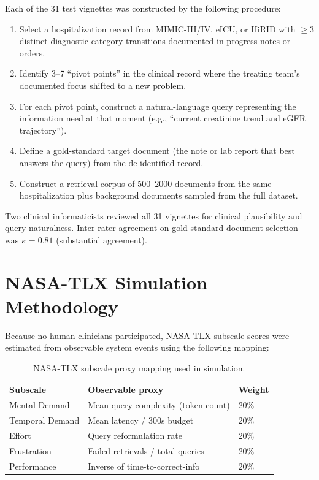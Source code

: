\documentclass[11pt]{article}
\begin{document}
Each of the 31 test vignettes was constructed by the following procedure:
\begin{enumerate}
  \item Select a hospitalization record from MIMIC-III/IV, eICU, or HiRID with
        $\geq 3$ distinct diagnostic category transitions documented in progress
        notes or orders.
  \item Identify 3--7 ``pivot points'' in the clinical record where the
        treating team's documented focus shifted to a new problem.
  \item For each pivot point, construct a natural-language query representing
        the information need at that moment (e.g., ``current creatinine trend
        and eGFR trajectory'').
  \item Define a gold-standard target document (the note or lab report that
        best answers the query) from the de-identified record.
  \item Construct a retrieval corpus of 500--2000 documents from the same
        hospitalization plus background documents sampled from the full dataset.
\end{enumerate}

Two clinical informaticists reviewed all 31 vignettes for clinical plausibility
and query naturalness. Inter-rater agreement on gold-standard document selection
was $\kappa = 0.81$ (substantial agreement).

\section{NASA-TLX Simulation Methodology}

Because no human clinicians participated, NASA-TLX subscale scores were estimated
from observable system events using the following mapping:

\begin{table}[h]
\centering
\caption{NASA-TLX subscale proxy mapping used in simulation.}
\begin{tabular}{lll}
\toprule
\textbf{Subscale} & \textbf{Observable proxy} & \textbf{Weight} \\
\midrule
Mental Demand    & Mean query complexity (token count) & 20\% \\
Temporal Demand  & Mean latency / 300s budget & 20\% \\
Effort           & Query reformulation rate & 20\% \\
Frustration      & Failed retrievals / total queries & 20\% \\
Performance      & Inverse of time-to-correct-info & 20\% \\
\bottomrule
\end{tabular}
\end{table}
\end{document}
